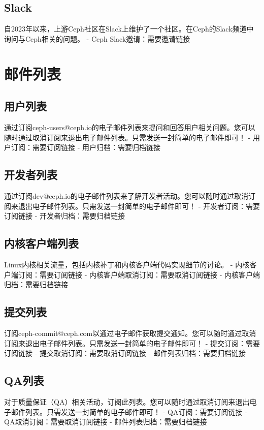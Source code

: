 \documentclass[12pt,UTF8]{ctexbook}
\begin{document}
\subsection{Slack}
自2023年以来，上游Ceph社区在Slack上维护了一个社区。在Ceph的Slack频道中询问与Ceph相关的问题。
- Ceph Slack邀请：需要邀请链接

\section{邮件列表}

\subsection{用户列表}
通过订阅ceph-users@ceph.io的电子邮件列表来提问和回答用户相关问题。您可以随时通过取消订阅来退出电子邮件列表。只需发送一封简单的电子邮件即可！
- 用户订阅：需要订阅链接
- 用户归档：需要归档链接

\subsection{开发者列表}
通过订阅dev@ceph.io的电子邮件列表来了解开发者活动。您可以随时通过取消订阅来退出电子邮件列表。只需发送一封简单的电子邮件即可！
- 开发者订阅：需要订阅链接
- 开发者归档：需要归档链接

\subsection{内核客户端列表}
Linux内核相关流量，包括内核补丁和内核客户端代码实现细节的讨论。
- 内核客户端订阅：需要订阅链接
- 内核客户端取消订阅：需要取消订阅链接
- 内核客户端归档：需要归档链接

\subsection{提交列表}
订阅ceph-commit@ceph.com以通过电子邮件获取提交通知。您可以随时通过取消订阅来退出电子邮件列表。只需发送一封简单的电子邮件即可！
- 提交订阅：需要订阅链接
- 提交取消订阅：需要取消订阅链接
- 邮件列表归档：需要归档链接

\subsection{QA列表}
对于质量保证（QA）相关活动，订阅此列表。您可以随时通过取消订阅来退出电子邮件列表。只需发送一封简单的电子邮件即可！
- QA订阅：需要订阅链接
- QA取消订阅：需要取消订阅链接
- 邮件列表归档：需要归档链接
\end{document}
